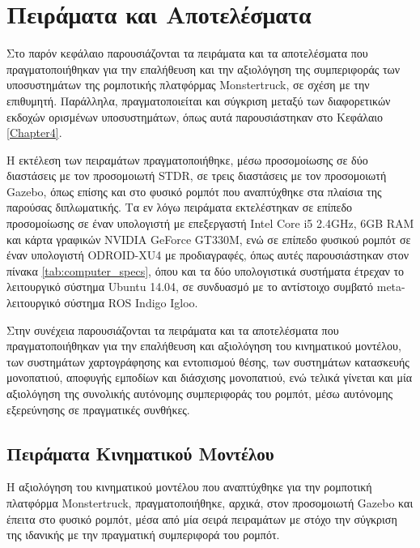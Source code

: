 \chapter{Πειράματα και Αποτελέσματα} \label{Chapter5}
Στο παρόν κεφάλαιο παρουσιάζονται τα πειράματα και τα αποτελέσματα που πραγματοποιήθηκαν για την επαλήθευση και την αξιολόγηση της συμπεριφοράς των υποσυστημάτων της ρομποτικής πλατφόρμας Monstertruck, σε σχέση με την επιθυμητή. Παράλληλα, πραγματοποιείται και σύγκριση μεταξύ των διαφορετικών εκδοχών ορισμένων υποσυστημάτων, όπως αυτά παρουσιάστηκαν στο Κεφάλαιο \ref{Chapter4}. 

\bigskip
Η εκτέλεση των πειραμάτων πραγματοποιήθηκε, μέσω προσομοίωσης σε δύο διαστάσεις με τον προσομοιωτή STDR, σε τρεις διαστάσεις με τον προσομοιωτή Gazebo, όπως επίσης και στο φυσικό ρομπότ που αναπτύχθηκε στα πλαίσια της παρούσας διπλωματικής. Τα εν λόγω πειράματα εκτελέστηκαν σε επίπεδο προσομοίωσης σε έναν υπολογιστή με επεξεργαστή Intel Core i5 2.4GHz, 6GB RAM και κάρτα γραφικών NVIDIA GeForce GT330M, ενώ σε επίπεδο φυσικού ρομπότ σε έναν υπολογιστή ODROID-XU4 με προδιαγραφές, όπως αυτές παρουσιάστηκαν στον πίνακα \ref{tab:computer_specs}, όπου και τα δύο υπολογιστικά συστήματα έτρεχαν το λειτουργικό σύστημα Ubuntu 14.04, σε συνδυασμό με το αντίστοιχο συμβατό meta-λειτουργικό σύστημα ROS Indigo Igloo.

\bigskip
Στην συνέχεια παρουσιάζονται τα πειράματα και τα αποτελέσματα που πραγματοποιήθηκαν για την επαλήθευση και αξιολόγηση του κινηματικού μοντέλου, των συστημάτων χαρτογράφησης και εντοπισμού θέσης, των συστημάτων κατασκευής μονοπατιού, αποφυγής εμποδίων και διάσχισης μονοπατιού, ενώ τελικά γίνεται και μία αξιολόγηση της συνολικής αυτόνομης συμπεριφοράς του ρομπότ, μέσω αυτόνομης εξερεύνησης σε πραγματικές συνθήκες.

\section{Πειράματα Κινηματικού Μοντέλου} \label{sec:kinematics_experiments}
Η αξιολόγηση του κινηματικού μοντέλου που αναπτύχθηκε για την ρομποτική πλατφόρμα Monstertruck, πραγματοποιήθηκε, αρχικά, στον προσομοιωτή Gazebo και έπειτα στο φυσικό ρομπότ, μέσα από μία σειρά πειραμάτων με στόχο την σύγκριση της ιδανικής με την πραγματική συμπεριφορά του ρομπότ.  

